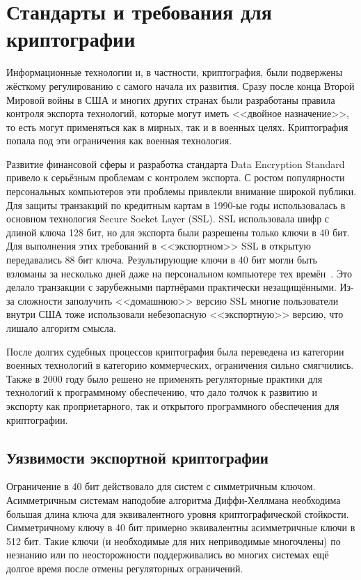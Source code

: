 \documentclass[times,specification,annotation]{itmo-student-thesis}
\begin{document}
\chapter{Стандарты и требования для криптографии}

Информационные технологии и, в частности, криптография, были подвержены жёсткому регулированию с самого начала их развития.
Сразу после конца Второй Мировой войны в США и многих других странах были разработаны правила контроля экспорта
технологий, которые могут иметь <<двойное назначение>>, то есть могут применяться как в мирных, так и в военных целях.
Криптография попала под эти ограничения как военная технология.

Развитие финансовой сферы и разработка стандарта Data Encryption Standard привело к серьёзным проблемам с контролем экспорта.
С ростом популярности персональных компьютеров эти проблемы привлекли внимание широкой публики.
Для защиты транзакций по кредитным картам в 1990-ые годы использовалась в основном технология Secure Socket Layer (SSL).
SSL использовала шифр с длиной ключа 128 бит, но для экспорта были разрешены только ключи в 40 бит.
Для выполнения этих требований в <<экспортном>> SSL в открытую передавались 88 бит ключа.
Результирующие ключи в 40 бит могли быть взломаны за несколько дней даже на персональном компьютере тех времён~\cite{lev01}.
Это делало транзакции с зарубежными партнёрами практически незащищёнными.
Из-за сложности заполучить <<домашнюю>> версию SSL многие пользователи внутри США тоже использовали небезопасную
<<экспортную>> версию, что лишало алгоритм смысла.

После долгих судебных процессов криптография была переведена из категории военных технологий в категорию коммерческих,
ограничения сильно смягчились.
Также в 2000 году было решено не применять регуляторные практики для технологий к программному обеспечению,
что дало толчок к развитию и экспорту как проприетарного, так и открытого программного обеспечения для криптографии.

\section{Уязвимости экспортной криптографии}\label{sec:logjam}

Ограничение в 40 бит действовало для систем с симметричным ключом.
Асимметричным системам наподобие алгоритма Диффи-Хеллмана необходима большая длина ключа для эквивалентного уровня криптографической стойкости.
Симметричному ключу в 40 бит примерно эквивалентны асимметричные ключи в 512 бит.
Такие ключи (и необходимые для них неприводимые многочлены) по незнанию или по неосторожности поддерживались во многих системах ещё
долгое время после отмены регуляторных ограничений.
\end{document}
